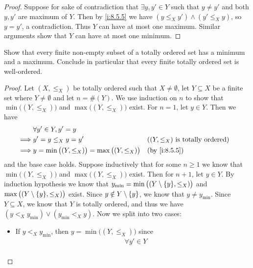 \begin{proof}
  Suppose for sake of contradiction that \(\exists y, y' \in Y\) such that \(y \neq y'\) and both \(y, y'\) are maximum of \(Y\).
  Then by \cref{i:8.5.5} we have \((y \leq_X y') \land (y' \leq_X y)\), so \(y = y'\), a contradiction.
  Thus \(Y\) can have at most one maximum.
  Similar arguments show that \(Y\) can have at most one minimum.
\end{proof}

\begin{ex}\label{i:ex:8.5.8}
  Show that every finite non-empty subset of a totally ordered set has a minimum and a maximum.
  Conclude in particular that every finite totally ordered set is well-ordered.
\end{ex}

\begin{proof}
  Let \((X, \leq_X)\) be totally ordered such that \(X \neq \emptyset\), let \(Y \subseteq X\) be a finite set where \(Y \neq \emptyset\) and let \(n = \#(Y)\).
  We use induction on \(n\) to show that \(\min\big((Y, \leq_X)\big)\) and \(\max\big((Y, \leq_X)\big)\) exist.
  For \(n = 1\), let \(y \in Y\).
  Then we have
  \begin{align*}
             & \forall y' \in Y, y' = y                                                                                   \\
    \implies & y' = y \leq_X y = y'                                      &  & \text{(\((Y, \leq_X)\) is totally ordered)} \\
    \implies & y = \min\big((Y, \leq_X)\big) = \max\big((Y, \leq_X)\big) &  & \by{i:8.5.5}
  \end{align*}
  and the base case holds.
  Suppose inductively that for some \(n \geq 1\) we know that \(\min\big((Y, \leq_X)\big)\) and \(\max\big((Y, \leq_X)\big)\) exist.
  Then for \(n + 1\), let \(y \in Y\).
  By induction hypothesis we know that \(y_{\min} = \min\big((Y \setminus \set{y}, \leq_X)\big)\) and \(\max\big((Y \setminus \set{y}, \leq_X)\big)\) exist.
  Since \(y \notin Y \setminus \left\lbrace y\right\rbrace\), we know that \(y \neq y_{\min}\).
  Since \(Y \subseteq X\), we know that \(Y\) is totally ordered, and thus we have \((y <_X y_{\min}) \lor (y_{\min} <_X y)\).
  Now we split into two cases:
  \begin{itemize}
    \item If \(y <_X y_{\min}\), then \(y = \min\big((Y, \leq_X)\big)\) since
          \begin{align*}
                     & \forall y' \in Y                                                                       \\

\end{align*}
\end{itemize}
\end{proof}
